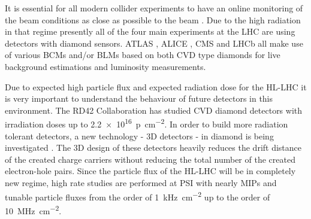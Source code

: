 It is essential for all modern collider experiments to have an online monitoring of the beam conditions as close as possible to the beam \cite{hllhc}. Due to the high radiation in that regime presently all of the four main experiments at the \ac{LHC} are using detectors with diamond sensors. ATLAS \cite{gorisek}, ALICE \cite{hempel}, CMS \cite{bartz} and LHCb \cite{domke} all make use of various \acp{BCM} and/or \acp{BLM} based on both \ac{CVD} type diamonds for live background estimations and luminosity measurements.\par
Due to expected high particle flux and expected radiation dose for the \ac{HL-LHC} it is very important to understand the behaviour of future detectors in this environment. The RD42 Collaboration has studied \ac{CVD} diamond detectors with irradiation doses up to \SI{2.2e16}{p\per\centi\meter^2}. In order to build more radiation tolerant detectors, a new technology - 3D detectors \cite{parker} - in diamond is being investigated \cite{3D} . The 3D design of these detectors heavily reduces the drift distance of the created charge carriers without reducing the total number of the created electron-hole pairs. Since the particle flux of the \ac{HL-LHC} will be in completely new regime, high rate studies are performed at \ac{PSI} with nearly \acp{MIP} and tunable particle fluxes from the order of \SI{1}{\kilo\hertz\per cm^2} up to the order of \SI{10}{\mega\hertz\per cm^2}.